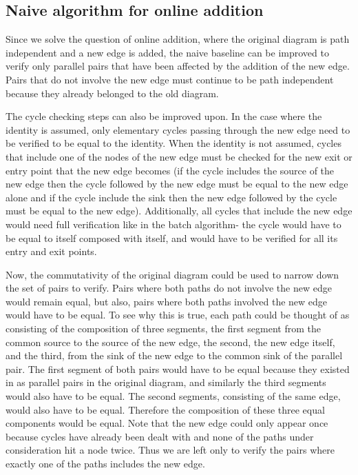 \documentclass{article}
\begin{document}
\subsection{Naive algorithm for online addition}

Since we solve the question of online addition, where the original diagram is path independent and a new edge is added, the naive baseline can be improved to verify only parallel pairs that have been affected by the addition of the new edge. Pairs that do not involve the new edge must continue to be path independent because they already belonged to the old diagram.

The cycle checking steps can also be improved upon. In the case where the identity is assumed, only elementary cycles passing through the new edge need to be verified to be equal to the identity. When the identity is not assumed, cycles that include one of the nodes of the new edge must be checked for the new exit or entry point that the new edge becomes (if the cycle includes the source of the new edge then the cycle followed by the new edge must be equal to the new edge alone and if the cycle include the sink then the new edge followed by the cycle must be equal to the new edge).
Additionally, all cycles that include the new edge would need full verification like in the batch algorithm- the cycle would have to be equal to itself composed with itself, and would have to be verified for all its entry and exit points.

Now, the commutativity of the original diagram could be used to narrow down the set of pairs to verify. Pairs where both paths do not involve the new edge would remain equal, but also, pairs where both paths involved the new edge would have to be equal. To see why this is true, each path could be thought of as consisting of the composition of three segments, the first segment from the common source to the source of the new edge, the second, the new edge itself, and the third, from the sink of the new edge to the common sink of the parallel pair. The first segment of both pairs would have to be equal because they existed in as parallel pairs in the original diagram, and similarly the third segments would also have to be equal. The second segments, consisting of the same edge, would also have to be equal. Therefore the composition of these three equal components would be equal. Note that the new edge could only appear once because cycles have already been dealt with and none of the paths under consideration hit a node twice. Thus we are left only to verify the pairs where exactly one of the paths includes the new edge.
\end{document}
